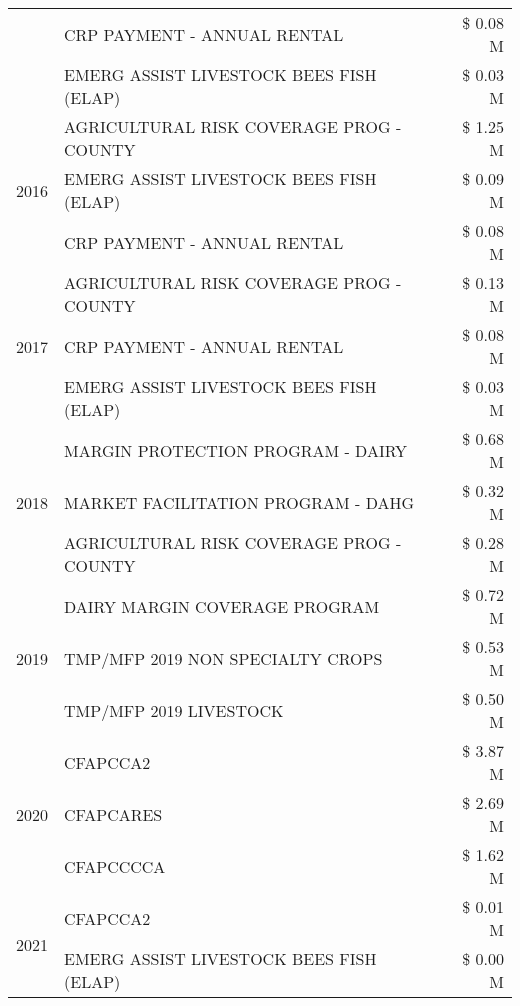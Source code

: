 \begin{tabular}{llr}
 & CRP PAYMENT - ANNUAL RENTAL & \$ 0.08 M \\
 & EMERG ASSIST LIVESTOCK BEES FISH (ELAP) & \$ 0.03 M \\
\cline{1-3}
\multirow[t]{3}{*}{2016} & AGRICULTURAL RISK COVERAGE PROG - COUNTY & \$ 1.25 M \\
 & EMERG ASSIST LIVESTOCK BEES FISH (ELAP) & \$ 0.09 M \\
 & CRP PAYMENT - ANNUAL RENTAL & \$ 0.08 M \\
\cline{1-3}
\multirow[t]{3}{*}{2017} & AGRICULTURAL RISK COVERAGE PROG - COUNTY & \$ 0.13 M \\
 & CRP PAYMENT - ANNUAL RENTAL & \$ 0.08 M \\
 & EMERG ASSIST LIVESTOCK BEES FISH (ELAP) & \$ 0.03 M \\
\cline{1-3}
\multirow[t]{3}{*}{2018} & MARGIN PROTECTION PROGRAM - DAIRY & \$ 0.68 M \\
 & MARKET FACILITATION PROGRAM - DAHG & \$ 0.32 M \\
 & AGRICULTURAL RISK COVERAGE PROG - COUNTY & \$ 0.28 M \\
\cline{1-3}
\multirow[t]{3}{*}{2019} & DAIRY MARGIN COVERAGE PROGRAM & \$ 0.72 M \\
 & TMP/MFP 2019 NON SPECIALTY CROPS & \$ 0.53 M \\
 & TMP/MFP 2019 LIVESTOCK & \$ 0.50 M \\
\cline{1-3}
\multirow[t]{3}{*}{2020} & CFAPCCA2 & \$ 3.87 M \\
 & CFAPCARES & \$ 2.69 M \\
 & CFAPCCCCA & \$ 1.62 M \\
\cline{1-3}
\multirow[t]{2}{*}{2021} & CFAPCCA2 & \$ 0.01 M \\
 & EMERG ASSIST LIVESTOCK BEES FISH (ELAP) & \$ 0.00 M \\
\cline{1-3}
\bottomrule
\end{tabular}
